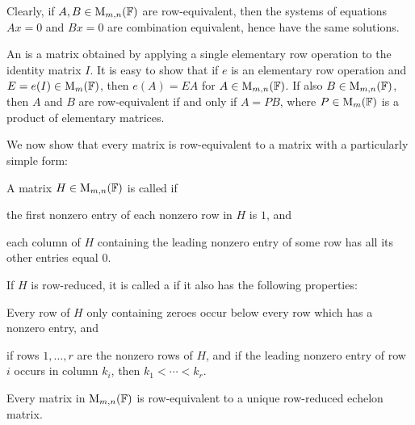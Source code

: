 Clearly, if $A, B \in \mathrm{M}_{m,n}(\mathbb{F})$ are row-equivalent, then the systems of equations $Ax = 0$ and $Bx = 0$ are combination equivalent, hence have the same solutions.

An  is a matrix obtained by applying a single elementary row operation to the identity matrix $I$. It is easy to show that if $e$ is an elementary row operation and $E = e(I) \in \mathrm{M}_{m}(\mathbb{F})$, then $e(A) = EA$ for $A \in \mathrm{M}_{m,n}(\mathbb{F})$. If also $B \in \mathrm{M}_{m,n}(\mathbb{F})$, then $A$ and $B$ are row-equivalent if and only if $A = PB$, where $P \in \mathrm{M}_{m}(\mathbb{F})$ is a product of elementary matrices.

We now show that every matrix is row-equivalent to a matrix with a particularly simple form:

\begin{definition}\label{def:mydef}
    A matrix $H \in \mathrm{M}_{m,n}(\mathbb{F})$ is called  if
    \begin{enumdefinition}
        \item \label{enumdef:myenum} the first nonzero entry of each nonzero row in $H$ is $1$, and
        \item each column of $H$ containing the leading nonzero entry of some row has all its other entries equal $0$.
    \end{enumdefinition}
    If $H$ is row-reduced, it is called a  if it also has the following properties:
    \begin{enumdefinition}[resume]
        \item Every row of $H$ only containing zeroes occur below every row which has a nonzero entry, and
        \item if rows $1, \ldots, r$ are the nonzero rows of $H$, and if the leading nonzero entry of row $i$ occurs in column $k_i$, then $k_1 < \cdots < k_r$.
    \end{enumdefinition}
\end{definition}

\begin{proposition}
    Every matrix in $\mathrm{M}_{m,n}(\mathbb{F})$ is row-equivalent to a unique row-reduced echelon matrix.
\end{proposition}

